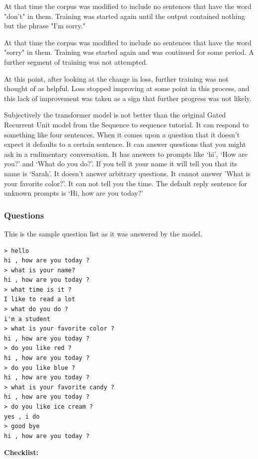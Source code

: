 At that time the corpus was modified to include no 
sentences that have the word "don't" in them. Training was started again until the output contained nothing but the phrase "I'm sorry." 

At that time the corpus was modified to include no sentences that have the word "sorry" in them. Training was started again and was continued for some period. A further segment of training was not attempted. 

At this point, after looking at the change in loss, further training was not thought of as helpful. Loss stopped improving at some point in this process, and this lack of improvement was taken as a sign that further progress was not likely.

Subjectively the transformer model is not better than the original Gated Recurrent Unit model from the Sequence to sequence tutorial. It can respond to something like four sentences. When it comes upon a question that it doesn't expect it defaults to a certain sentence. It can answer questions that you might ask in a rudimentary conversation. It has answers to prompts like `hi', `How are you?' and `What do you do?'. If you tell it your name it will tell you that its name is `Sarah'. It doesn't answer arbitrary questions. It cannot answer 'What is your favorite color?'. It can not tell you the time. The default reply sentence for unknown prompts is `Hi, how are you today?'

\subsubsection*{Questions}
This is the sample question list as it was answered by the model.

\begin{verbatim}
> hello
hi , how are you today ?
> what is your name?
hi , how are you today ?
> what time is it ?
I like to read a lot
> what do you do ?
i'm a student
> what is your favorite color ?
hi , how are you today ?
> do you like red ?
hi , how are you today ?
> do you like blue ?
hi , how are you today ?
> what is your favorite candy ?
hi , how are you today ?
> do you like ice cream ?
yes , i do 
> good bye
hi , how are you today ?
\end{verbatim}

\noindent \textbf{Checklist:} 

